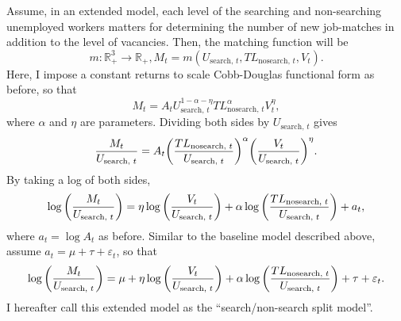 \documentclass[a4paper, 11pt, tikz]{article}
\begin{document}
Assume, in an extended model, each level of the searching and non-searching unemployed workers matters for determining the number of new job-matches in addition to the level of vacancies.
Then, the matching function will be
\begin{equation}
  m: \mathbb{R}_+^3 \to \mathbb{R}_+, M_t = m(U_{\text{search, }t}, TL_{\text{nosearch, }t}, V_t).
\end{equation}
Here, I impose a constant returns to scale Cobb-Douglas functional form as before, so that
\begin{equation}
  M_t = A_tU_{\text{search, }t}^{1 - \alpha - \eta}TL_{\text{nosearch, }t}^\alpha V_t^\eta,
\end{equation}
where $\alpha$ and $\eta$ are parameters.
Dividing both sides by $U_{\text{search, }t}$ gives
\begin{equation}
  \frac{M_t}{U_{\text{search, }t}} = A_t\qty(\frac{TL_{\text{nosearch, }t}}{U_{\text{search, }t}})^\alpha\qty(\frac{V_t}{U_{\text{search, }t}})^\eta.
\end{equation}
By taking a log of both sides,
\begin{equation}
  \log\qty(\frac{M_t}{U_{\text{search, }t}}) = \eta\log\qty(\frac{V_t}{U_{\text{search, }t}}) + \alpha\log\qty(\frac{TL_{\text{nosearch, }t}}{U_{\text{search, }t}}) + a_t,
\end{equation}
where $a_t = \log A_t$ as before.
Similar to the baseline model described above, assume $a_t = \mu + \tau + \varepsilon_t$, so that
\begin{equation} \label{matching_function_formula_by_search}
  \log\qty(\frac{M_t}{U_{\text{search, }t}}) = \mu + \eta\log\qty(\frac{V_t}{U_{\text{search, }t}}) + \alpha\log\qty(\frac{TL_{\text{nosearch, }t}}{U_{\text{search, }t}}) + \tau + \varepsilon_t.
\end{equation}
I hereafter call this extended model as the ``search/non-search split model''.
\end{document}
